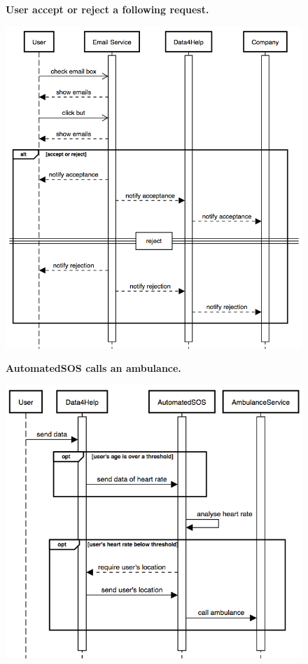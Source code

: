 \documentclass{article}
\begin{document}
\begin{figure}[h!]
\centering
    \textbf{User accept or reject a following request.}\par\medskip
	\includegraphics[width= \linewidth]{acceptreject.png}
\end{figure}\newpage
\begin{figure}[h!]
\centering
    \textbf{AutomatedSOS calls an ambulance.}\par\medskip
	\includegraphics[width= \linewidth]{callambulance.png}
\end{figure}\newpage
\end{document}
